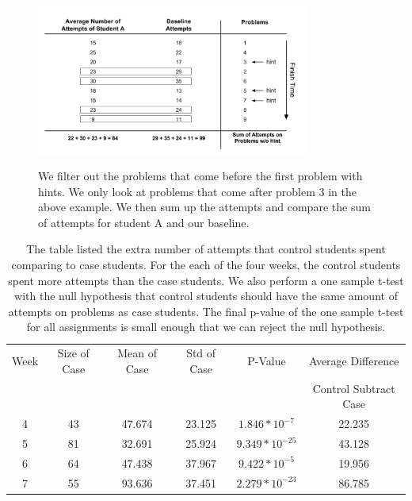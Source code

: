\documentclass{llncs2e/llncs}
\begin{document}
\begin{figure}[ht]
   \centering
   \caption{We filter out the problems that come before the first problem with hints. We only look at problems that come after problem 3 in the above example. We then sum up the attempts and compare the sum of attempts for student A and our baseline.}
   \includegraphics[width=0.8\textwidth]{image/Filter_problems.png}
   \label{fig:pro_no_hint}
\end{figure}

\begin{table}[th]
\caption{The table listed the extra number of attempts that control students spent comparing to case students. For the each of the four weeks, the control students spent more attempts than the case students. We also perform a one sample t-test with the null hypothesis that control students should have the same amount of attempts on problems as case students. The final p-value of the one sample t-test for all assignments is small enough that we can reject the null hypothesis.}
\begin{center}
  \begin{tabular}{| c | c | c | c | c | c |}
  \hline
   Week & Size of Case & Mean of Case & Std of Case &  P-Value & Average Difference\\
      & & & & & Control Subtract Case  \\ \hline
	4 & 43 & 47.674 & 23.125 & $1.846 * 10^{-7}$ & 22.235\\
	5 & 81 & 32.691 & 25.924 & $9.349 * 10 ^{-25}$ & 43.128\\
	6 & 64 & 47.438 & 37.967 & $9.422 * 10^{-5}$ & 19.956 \\
	7 & 55 & 93.636 & 37.451 & $2.279 * 10^{-23}$ & 86.785\\
	\hline
  \end{tabular}
  \label{tab:no_hint}
  \end{center}
\end{table}
\end{document}
